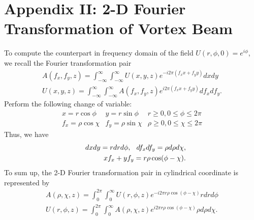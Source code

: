 \section*{Appendix II: 2-D Fourier Transformation of Vortex Beam}
To compute the counterpart in frequency domain of the field $U(r, \phi, 0) = e^{i\phi}$, we recall the Fourier transformation pair
\begin{eqnarray}
	A(f_x, f_y, z) = \int_{-\infty}^{\infty} \int_{-\infty}^{\infty} U(x, y, z)
	e^{-i 2 \pi (f_x x + f_y y)} dx dy
	\nonumber\\
	U(x, y, z) = \int_{-\infty}^{\infty} \int_{-\infty}^{\infty} A(f_x, f_y, z)
	e^{i 2 \pi (f_x x + f_y y)} df_x df_y.
	\nonumber
\end{eqnarray}
Perform the following change of variable:
\begin{eqnarray}
	x = r\cos\phi & y = r\sin\phi & r \ge 0, 0 \le \phi \le 2\pi
	\nonumber\\
	f_x = \rho\cos\chi & f_y = \rho\sin\chi & \rho \ge 0, 0 \le \chi \le 2\pi
	\nonumber
\end{eqnarray}
Thus, we have
\begin{eqnarray}
	&&dx dy = r dr d\phi, \hspace{0.1in} df_x df_y = \rho d\rho d\chi,
	\nonumber\\
	&&xf_x + yf_y = r\rho \cos(\phi - \chi).
	\nonumber
\end{eqnarray}
To sum up, the 2-D Fourier transformation pair in cylindrical coordinate is represented by
\begin{eqnarray}
	A(\rho, \chi, z) = \int_{0}^{2\pi} \int_{0}^{\infty} U(r, \phi, z)
	e^{-i 2 \pi r \rho \cos(\phi - \chi)} r dr d\phi
	\nonumber\\
	U(r, \phi, z) = \int_{0}^{2\pi} \int_{0}^{\infty} A(\rho, \chi, z)
	e^{i 2 \pi r \rho \cos(\phi - \chi)} \rho d\rho d\chi.
	\nonumber
\end{eqnarray}

